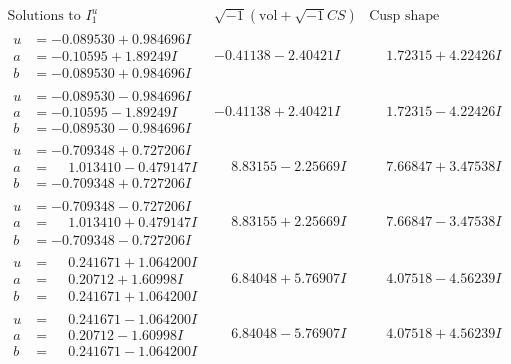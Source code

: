\documentclass[1p]{elsarticle_modified}
\theoremstyle{definition}
\newcommand{\I}{\sqrt{-1}}
\begin{document}
$$\begin{array}{c|c|c}  
\text{Solutions to }I^u_{1}& \I (\text{vol} + \sqrt{-1}CS) & \text{Cusp shape}\\
 \hline 
\begin{aligned}
u &= -0.089530 + 0.984696 I \\
a &= -0.10595 + 1.89249 I \\
b &= -0.089530 + 0.984696 I\end{aligned}
 & -0.41138 - 2.40421 I & \phantom{-}1.72315 + 4.22426 I \\ \hline\begin{aligned}
u &= -0.089530 - 0.984696 I \\
a &= -0.10595 - 1.89249 I \\
b &= -0.089530 - 0.984696 I\end{aligned}
 & -0.41138 + 2.40421 I & \phantom{-}1.72315 - 4.22426 I \\ \hline\begin{aligned}
u &= -0.709348 + 0.727206 I \\
a &= \phantom{-}1.013410 - 0.479147 I \\
b &= -0.709348 + 0.727206 I\end{aligned}
 & \phantom{-}8.83155 - 2.25669 I & \phantom{-}7.66847 + 3.47538 I \\ \hline\begin{aligned}
u &= -0.709348 - 0.727206 I \\
a &= \phantom{-}1.013410 + 0.479147 I \\
b &= -0.709348 - 0.727206 I\end{aligned}
 & \phantom{-}8.83155 + 2.25669 I & \phantom{-}7.66847 - 3.47538 I \\ \hline\begin{aligned}
u &= \phantom{-}0.241671 + 1.064200 I \\
a &= \phantom{-}0.20712 + 1.60998 I \\
b &= \phantom{-}0.241671 + 1.064200 I\end{aligned}
 & \phantom{-}6.84048 + 5.76907 I & \phantom{-}4.07518 - 4.56239 I \\ \hline\begin{aligned}
u &= \phantom{-}0.241671 - 1.064200 I \\
a &= \phantom{-}0.20712 - 1.60998 I \\
b &= \phantom{-}0.241671 - 1.064200 I\end{aligned}
 & \phantom{-}6.84048 - 5.76907 I & \phantom{-}4.07518 + 4.56239 I \\ \hline\begin{aligned}

\end{aligned}
\end{array}$$
\end{document}
